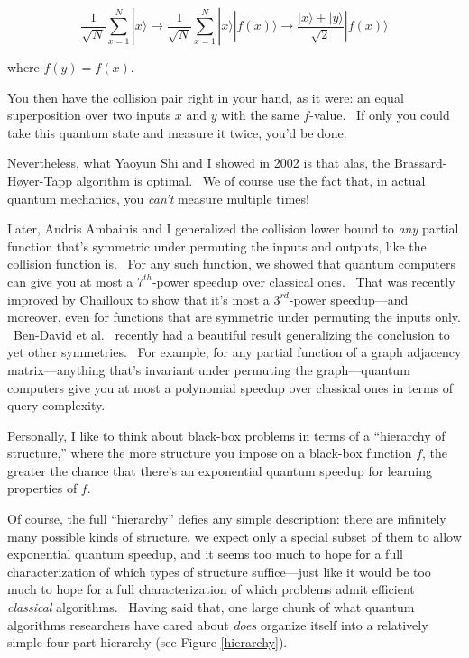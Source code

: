 \documentclass[12pt]{article}
\begin{document}
$$ \frac{1}{\sqrt{N}} \sum_{x=1}^{N} |x\rangle \rightarrow \frac{1}{\sqrt{N}} \sum_{x=1}^{N} |x\rangle |f(x)\rangle \rightarrow \frac{|x\rangle+|y\rangle}{\sqrt{2}} |f(x)\rangle$$

\noindent where $f(y)=f(x)$.

You then have the collision pair right in your hand, as it were: an equal superposition over two inputs $x$ and $y$ with the same $f$-value. \ If only you could take this quantum state and measure it twice, you'd be done.

Nevertheless, what Yaoyun Shi and I showed in 2002 \cite{as} is that alas, the Brassard-H{\o}yer-Tapp algorithm is optimal. \ We of course use the fact that, in actual quantum mechanics, you \emph{can't} measure multiple times!

Later, Andris Ambainis and I \cite{aa:struc} generalized the collision lower bound to \emph{any} partial function that's symmetric under permuting the inputs and outputs, like the collision function is. \ For any such function, we showed that quantum computers can give you at most a $7^{th}$-power speedup over classical ones. \ That was recently improved by Chailloux \cite{chailloux} to show that it's most a $3^{rd}$-power speedup---and moreover, even for functions that are symmetric under permuting the inputs only. \ Ben-David et al.\ \cite{bendavid:symmetry} recently had a beautiful result generalizing the conclusion to yet other symmetries. \ For example, for any partial function of a graph adjacency matrix---anything that's invariant under permuting the graph---quantum computers give you at most a polynomial speedup over classical ones in terms of query complexity.

Personally, I like to think about black-box problems in terms of a ``hierarchy of structure,'' where the more structure you impose on a black-box function $f$, the greater the chance that there's an exponential quantum speedup for learning properties of $f$.

Of course, the full ``hierarchy'' defies any simple description: there are infinitely many possible kinds of structure, we expect only a special subset of them to allow exponential quantum speedup, and it seems too much to hope for a full characterization of which types of structure suffice---just like it would be too much to hope for a full characterization of which problems admit efficient \emph{classical} algorithms. \ Having said that, one large chunk of what quantum algorithms researchers have cared about \emph{does} organize itself into a relatively simple four-part hierarchy (see Figure \ref{hierarchy}).
\end{document}
